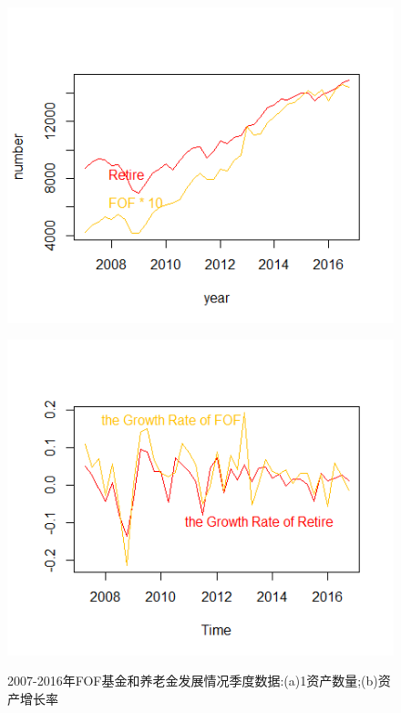 \begin{figure}[ht]
	\begin{minipage}[ht]{0.47\textwidth}
		\centering
		\includegraphics[width=1\textwidth]{pic/3-0-1.png}
		\subcaption{}\label{pic/3-0-1.png}
	\end{minipage}%
	\hspace{0.06\textwidth}
	\begin{minipage}[ht]{0.47\textwidth}
		\centering
		\includegraphics[width=1\textwidth]{pic/3-0-2.png}
		\subcaption{}\label{pic/3-0-2.png}
	\end{minipage}
	\caption{2007-2016年FOF基金和养老金发展情况季度数据:(a)1资产数量;(b)资产增长率}
\end{figure}





